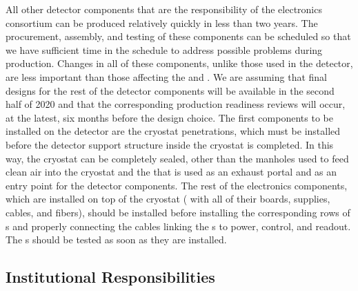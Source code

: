 All other detector components that are the responsibility of the
 electronics consortium can be produced relatively quickly
in less than two years. The procurement, assembly, and
testing of these components can be scheduled so that
we have sufficient time in the schedule to address possible 
problems during production. Changes in all of these
components, unlike those used in the  detector,
are less important than those affecting the 
and . We are assuming that final
designs for the rest of the detector components will be 
available in the second half of 2020 and that the corresponding 
production readiness reviews will occur, at the latest, six months 
before the  design choice.
The first components to be installed on the detector are the cryostat
penetrations, which must be installed before the 
detector support structure inside the cryostat is completed.
In this way, the cryostat can be completely sealed, other than
the manholes used to feed clean air into the cryostat
and the  that is used as an exhaust portal 
and as an entry point for the detector components. The rest of the
 electronics components, which are installed on top of the 
cryostat ( with all of their boards, supplies, cables,
and fibers), should be installed before installing
the corresponding rows of s and properly connecting
the cables linking the s to power, control, and readout. 
The s should be tested as soon as they are installed. 

\subsection{Institutional Responsibilities}
\label{sec:fdsp-tpcelec-management-resp}

